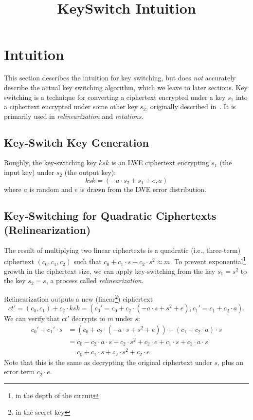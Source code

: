 \documentclass[../../fheimpl.tex]{subfiles}
\begin{document}
	\ifcompileasbook
	\else
	\title{KeySwitch Intuition}
	\hypersetup{pageanchor=false}
	\maketitle
	\listoffixmes
	\tableofcontents
	\compileasbooktrue
	\hypersetup{pageanchor=true}
	\fi

\section{Intuition}
\label{sec:intuition}
This section describes the intuition for key switching, but does \emph{not} accurately describe the actual key switching algorithm, which we leave to later sections.
Key switching is a technique for converting a ciphertext encrypted under a key $s_1$ into a ciphertext encrypted under some other key $s_2$, originally described in~\cite{cryptoeprint:2011/344}. It is primarily used in \emph{relinearization} and \emph{rotations}.

\subsection{Key-Switch Key Generation}
Roughly, the key-switching key $ksk$ is an LWE ciphertext encrypting $s_1$ (the input key) under $s_2$ (the output key):
\[ksk = (-a\cdot s_2 + s_1 + e, a)\]
where $a$ is random and $e$ is drawn from the LWE error distribution.

\subsection{Key-Switching for Quadratic Ciphertexts (Relinearization)}
The result of multiplying two linear ciphertexts is a quadratic (i.e., three-term) ciphertext $(c_0, c_1, c_2)$ such that $c_0 + c_1\cdot s + c_2\cdot s^2 \approx m$. To prevent exponential\footnote{in the depth of the circuit} growth in the ciphertext size, we can apply key-switching from the key $s_1=s^2$ to the key $s_2=s$, a process called \emph{relinearization}.

Relinearization outputs a new (linear\footnote{in the secret key}) ciphertext 
\[ct' = (c_0, c_1) + c_2\cdot ksk = (c_0'=c_0 + c_2\cdot(-a\cdot s + s^2 + e), c_1'=c_1 + c_2\cdot a).\] We can verify that $ct'$ decrypts to $m$ under $s$:
\begin{align*}
	c_0' + c_1'\cdot s &= (c_0 + c_2\cdot(-a\cdot s + s^2 + e)) + (c_1 + c_2\cdot a)\cdot s \\
	&= c_0 - c_2\cdot a\cdot s + c_2\cdot s^2 + c_2\cdot e + c_1\cdot s + c_2\cdot a\cdot s \\
	&= c_0 + c_1\cdot s + c_2\cdot s^2 + c_2\cdot e
\end{align*}
Note that this is the same as decrypting the original ciphertext under $s$, plus an error term $c_2\cdot e$.
\end{document}
